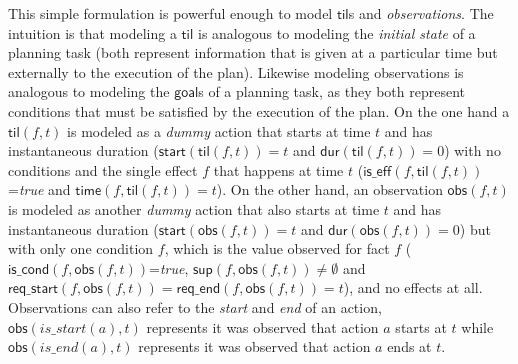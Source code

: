 \documentclass{ecai}
\newcommand{\dur}{\mathsf{dur}}    %
\newcommand{\iscond}{\mathsf{is\_cond}}    %
\newcommand{\iseff}{\mathsf{is\_eff}}    %
\newcommand{\obs}{\mathsf{obs}}    %
\newcommand{\start}{\mathsf{start}}%
\newcommand{\til}{\mathsf{til}}    %
\newcommand{\supp}{\mathsf{sup}}   %
\newcommand{\tim}{\mathsf{time}}   %
\newcommand{\reqs}{\mathsf{req\_{start}}} %
\newcommand{\reqe}{\mathsf{req\_{end}}}   %
\newcommand{\goal}{\mathsf{goal}}  %
\begin{document}
This simple formulation is powerful enough to model $\til$s and {\em observations}. The intuition is that modeling a $\til$ is analogous to modeling the {\em initial state} of a planning task (both represent information that is given at a particular time but externally to the execution of the plan). Likewise modeling observations is analogous to modeling the $\goal$s of a planning task, as they both represent conditions that must be satisfied by the execution of the plan. On the one hand a $\til(f,t)$ is modeled as a {\em dummy} action that starts at time $t$ and has instantaneous duration ($\start(\til(f,t))=t$ and $\dur(\til(f,t))=0$) with no conditions and the single effect $f$ that happens at time $t$ ($\iseff(f,\til(f,t))$=\textit{true} and $\tim(f,\til(f,t))=t$). On the other hand, an observation $\obs(f,t)$ is modeled as another {\em dummy} action that also starts at time $t$ and has instantaneous duration ($\start(\obs(f,t))=t$ and $\dur(\obs(f,t))=0$) but with only one condition $f$, which is the value observed for fact $f$ ($\iscond(f,\obs(f,t))$=\textit{true}, $\supp(f,\obs(f,t))\neq \emptyset$ and $\reqs(f,\obs(f,t))=\reqe(f,\obs(f,t))=t$), and no effects at all. Observations can also refer to the {\em start} and {\em end} of an action, $\obs(is\_start(a),t)$ represents it was observed that action $a$ starts at $t$ while $\obs(is\_end(a),t)$ represents it was observed that action $a$ ends at $t$.
\end{document}
